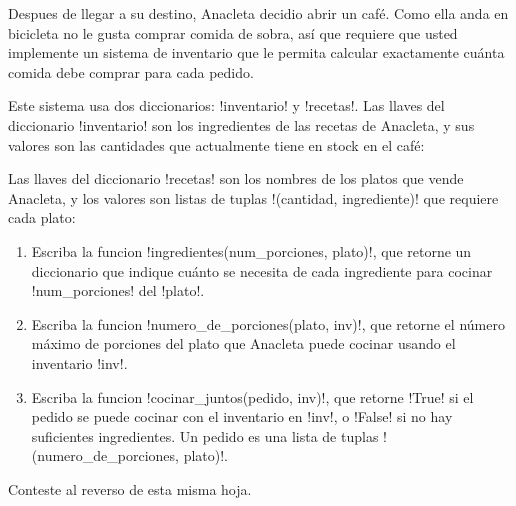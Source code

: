 Despues de llegar a su destino,
Anacleta decidio abrir un café.
Como ella anda en bicicleta
no le gusta comprar comida de sobra,
así que requiere que usted implemente un sistema de inventario
que le permita calcular exactamente
cuánta comida debe comprar para cada pedido.

Este sistema usa dos diccionarios: \li!inventario! y \li!recetas!.
Las llaves del diccionario \li!inventario!
son los ingredientes de las recetas de Anacleta,
y sus valores son las cantidades que actualmente tiene en stock en el café:


Las llaves del diccionario \li!recetas!
son los nombres de los platos que vende Anacleta,
y los valores son listas de tuplas \li!(cantidad, ingrediente)!
que requiere cada plato:



\begin{enumerate}[leftmargin=0pt,label=\emph{\alph*})]

  \item
    Escriba la funcion \li!ingredientes(num_porciones, plato)!,
    que retorne un diccionario que indique
    cuánto se necesita de cada ingrediente
    para cocinar \li!num_porciones! del \li!plato!.
    

  \item
    Escriba la funcion \li!numero_de_porciones(plato, inv)!,
    que retorne el número máximo de porciones del plato
    que Anacleta puede cocinar usando el inventario \li!inv!.
    

  \item
    Escriba la funcion \li!cocinar_juntos(pedido, inv)!,
    que retorne \li!True! si el pedido se puede cocinar
    con el inventario en \li!inv!,
    o \li!False! si no hay suficientes ingredientes.
    Un pedido es una lista de tuplas \li!(numero_de_porciones, plato)!.
    

\end{enumerate}


Conteste al reverso de esta misma hoja.

